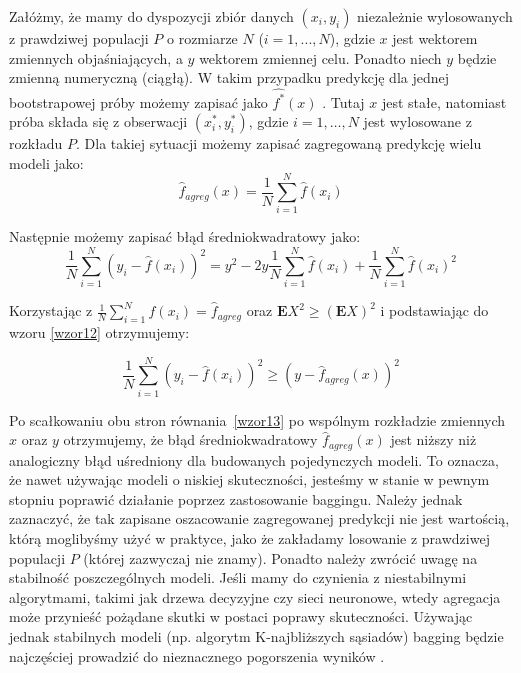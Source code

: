 \documentclass[12pt,a4paper,twoside,openany]{book}
\begin{document}
Załóżmy, że mamy do dyspozycji zbiór danych $(x_i, y_i)$ niezależnie wylosowanych z prawdziwej populacji $P$ o rozmiarze $N$ ($i = 1, ..., N$), gdzie $x$ jest wektorem zmiennych objaśniających, a $y$ wektorem zmiennej celu. Ponadto niech $y$ będzie zmienną numeryczną (ciągłą). W takim przypadku predykcję dla jednej bootstrapowej próby możemy zapisać jako $\hat{f^{*}}(x)$ . Tutaj $x$ jest stałe, natomiast próba składa się z obserwacji $(x_i^*, y_i^*)$, gdzie $i = 1, …, N$ jest wylosowane z rozkładu $P$. Dla takiej sytuacji możemy zapisać zagregowaną predykcję wielu modeli jako:
\begin{equation} \label{wzor11}
\hat{f}_{agreg}(x) = \frac{1}{N} \sum_{i = 1}^{N}\hat{f}(x_i)
\end{equation}

Następnie możemy zapisać błąd średniokwadratowy jako:
\begin{equation} \label{wzor12}
\frac{1}{N} \sum_{i = 1}^{N} (y_i - \hat{f}(x_i))^2 = y^2 - 2y\frac{1}{N} \sum_{i = 1}^{N} \hat{f}(x_i) + \frac{1}{N}\sum_{i = 1}^{N}\hat{f}(x_i)^2
\end{equation}

Korzystając z $\frac{1}{N}\sum_{i = 1}^{N}\hat{f}(x_i) = \hat{f}_{agreg}$ oraz $\mathbf{E}X^2 \geq (\mathbf{E}X)^2$ i podstawiając do wzoru \ref{wzor12} otrzymujemy:

\begin{equation} \label{wzor13}
\frac{1}{N}\sum_{i = 1}^{N}(y_i - \hat{f}(x_i))^2 \geq (y - \hat{f}_{agreg}(x))^2
\end{equation}

Po scałkowaniu obu stron równania~\ref{wzor13} po wspólnym rozkładzie zmiennych $x$ oraz $y$ otrzymujemy, że błąd średniokwadratowy $\hat{f}_{agreg}(x)$ jest niższy niż analogiczny błąd uśredniony dla budowanych pojedynczych modeli. To oznacza, że nawet używając modeli o niskiej skuteczności, jesteśmy w stanie w pewnym stopniu poprawić działanie poprzez zastosowanie baggingu. Należy jednak zaznaczyć, że tak zapisane oszacowanie zagregowanej predykcji nie jest wartością, którą moglibyśmy użyć w praktyce, jako że zakładamy losowanie z prawdziwej populacji $P$ (której zazwyczaj nie znamy). Ponadto należy zwrócić uwagę na stabilność poszczególnych modeli. Jeśli mamy do czynienia z niestabilnymi algorytmami, takimi jak drzewa decyzyjne czy sieci neuronowe, wtedy agregacja może przynieść pożądane skutki w postaci poprawy skuteczności. Używając jednak stabilnych modeli (np. algorytm K-najbliższych sąsiadów) bagging będzie najczęściej prowadzić do nieznacznego pogorszenia wyników \citep{hastie2009}. 
\end{document}
